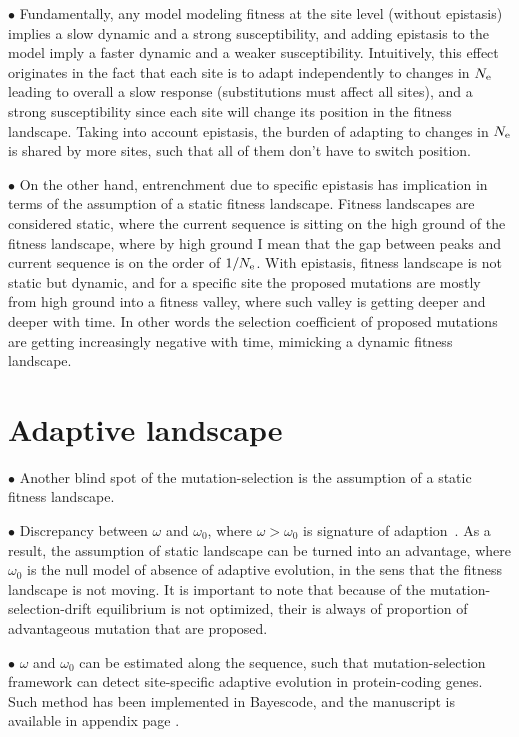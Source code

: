 $\bullet$ Fundamentally, any model modeling fitness at the site level (without epistasis) implies a slow dynamic and a strong susceptibility, and adding epistasis to the model imply a faster dynamic and a weaker susceptibility.
Intuitively, this effect originates in the fact that each site is to adapt independently to changes in $N_{\textrm{e}}$ leading to overall a slow response (substitutions must affect all sites), and a strong susceptibility since each site will change its position in the fitness landscape.
Taking into account epistasis, the burden of adapting to changes in $N_{\textrm{e}}$ is shared by more sites, such that all of them don't have to switch position.

$\bullet$ On the other hand, entrenchment due to specific epistasis has implication in terms of the assumption of a static fitness landscape.
Fitness landscapes are considered static, where the current sequence is sitting on the high ground of the fitness landscape, where by high ground I mean that the gap between peaks and current sequence is on the order of $1 / N_{\textrm{e}}$.
With epistasis, fitness landscape is not static but dynamic, and for a specific site the proposed mutations are mostly from high ground into a fitness valley, where such valley is getting deeper and deeper with time.
In other words the selection coefficient of proposed mutations are getting increasingly negative with time, mimicking a dynamic fitness landscape.

\section{Adaptive landscape}
\label{sec:adaptative-landscape}

$\bullet$ Another blind spot of the mutation-selection is the assumption of a static fitness landscape.

$\bullet$ Discrepancy between $\omega$ and $\omega_0$, where $\omega > \omega_0$ is signature of adaption~\citep{Rodrigue2016}.
As a result, the assumption of static landscape can be turned into an advantage, where $\omega_0$ is the null model of absence of adaptive evolution, in the sens that the fitness landscape is not moving.
It is important to note that because of the mutation-selection-drift equilibrium is not optimized, their is always of proportion of advantageous mutation that are proposed.

$\bullet$ $\omega$ and $\omega_0$ can be estimated along the sequence, such that mutation-selection framework can detect site-specific adaptive evolution in protein-coding genes.
Such method has been implemented in Bayescode, and the manuscript is available in appendix page \pageref{sec-appendix:MutSelM3starMBE}.

